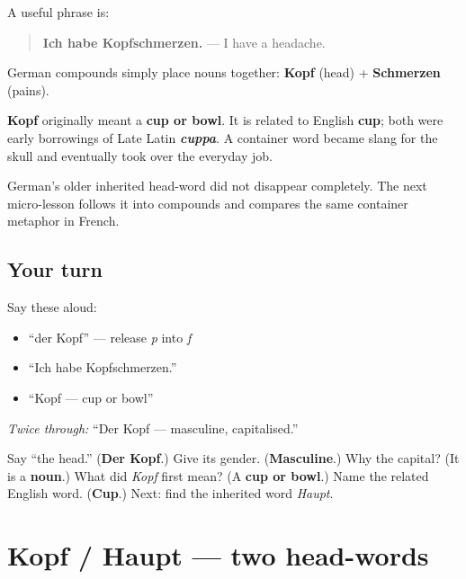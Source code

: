 \begin{grammarlens}[title={Grammar Lens: Kopf + Schmerzen}]
A useful phrase is:

\begin{quote}
\textbf{Ich habe Kopfschmerzen.} — I have a headache.
\end{quote}

German compounds simply place nouns together: \textbf{Kopf} (head) + \textbf{Schmerzen} (pains).
\end{grammarlens}

\begin{cousinweb}
\textbf{Kopf} originally meant a \textbf{cup or bowl}. It is related to English \textbf{cup}; both were early borrowings of Late Latin \emph{\textbf{cuppa}}. A container word became slang for the skull and eventually took over the everyday job.

German’s older inherited head-word did not disappear completely. The next micro-lesson follows it into compounds and compares the same container metaphor in French.
\end{cousinweb}

\subsection*{Your turn}
Say these aloud:

\begin{itemize}
\raggedright
  \item “der Kopf” — release \emph{p} into \emph{f}
  \item “Ich habe Kopfschmerzen.”
  \item “Kopf — cup or bowl”
\end{itemize}

\emph{Twice through:} “Der Kopf — masculine, capitalised.”

\begin{tcolorbox}[breakable,colback=teal!4,colframe=teal!35!black,title={Before you move on}]
Say “the head.” (\textbf{Der Kopf}.) Give its gender. (\textbf{Masculine}.) Why the capital? (It is a \textbf{noun}.) What did \emph{Kopf} first mean? (A \textbf{cup or bowl}.) Name the related English word. (\textbf{Cup}.) Next: find the inherited word \emph{Haupt}.
\end{tcolorbox}
\section[Kopf / Haupt]{Kopf / Haupt — two head-words}

